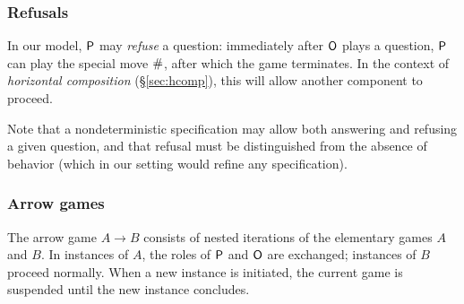 
\subsubsection{Refusals} %

In our model,
$ \mathsf{P} $ may \emph{refuse} a question:
immediately after $ \mathsf{O} $ plays a question,
$ \mathsf{P} $ can play the special move $ \mathsf{\#} $,
after which the game terminates.
In the context of
\emph{horizontal composition} (\S\ref{sec:hcomp}),
this will allow another component to proceed.

Note that a nondeterministic specification
may allow both answering and refusing a given question,
and that refusal must be distinguished from
the absence of behavior
(which in our setting would refine any specification).


\subsubsection{Arrow games} %
\label{sec:arrow}

The arrow game $A \rightarrow B$ consists of
nested iterations of the elementary games $A$ and $B$.
In instances of $A$, the roles of $ \mathsf{P} $ and $ \mathsf{O} $ are exchanged;
instances of $B$ proceed normally.
When a new instance is initiated,
the current game is suspended
until the new instance concludes.

